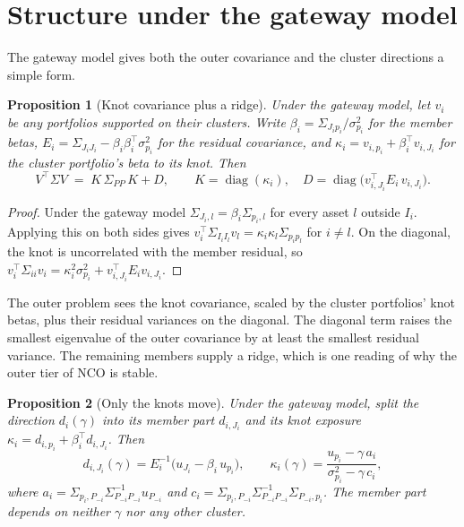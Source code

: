 \documentclass[11pt]{article}
\DeclareMathOperator{\diag}{diag}
\newtheorem{proposition}{Proposition}
\begin{document}
\section{Structure under the gateway model}
\label{sec:structure}

The gateway model gives both the outer covariance and the cluster
directions a simple form.

\begin{proposition}[Knot covariance plus a ridge]
\label{prop:outer}
Under the gateway model, let $v_i$ be any portfolios supported on their
clusters. Write $\beta_i=\Sigma_{J_ip_i}/\sigma_{p_i}^2$ for the member
betas, $E_i=\Sigma_{J_iJ_i}-\beta_i\beta_i^\top\sigma_{p_i}^2$ for the
residual covariance, and $\kappa_i=v_{i,p_i}+\beta_i^\top v_{i,J_i}$ for
the cluster portfolio's beta to its knot. Then
\begin{equation}
  V^\top\Sigma V \;=\; K\,\Sigma_{PP}\,K + D,
  \qquad K=\diag(\kappa_i),
  \quad D=\diag\!\big(v_{i,J_i}^\top E_i\,v_{i,J_i}\big).
  \label{eq:outer}
\end{equation}
\end{proposition}

\begin{proof}
Under the gateway model $\Sigma_{J_i,l}=\beta_i\Sigma_{p_i,l}$ for every
asset $l$ outside $I_i$. Applying this on both sides gives
$v_i^\top\Sigma_{I_iI_l}v_l=\kappa_i\kappa_l\Sigma_{p_ip_l}$ for $i\neq l$.
On the diagonal, the knot is uncorrelated with the member residual, so
$v_i^\top\Sigma_{ii}v_i=\kappa_i^2\sigma_{p_i}^2+v_{i,J_i}^\top E_iv_{i,J_i}$.
\end{proof}

The outer problem sees the knot covariance, scaled by the cluster
portfolios' knot betas, plus their residual variances on the diagonal. The
diagonal term raises the smallest eigenvalue of the outer covariance by at
least the smallest residual variance. The remaining members supply a ridge, which
is one reading of why the outer tier of NCO is stable.

\begin{proposition}[Only the knots move]
\label{prop:knotsmove}
Under the gateway model, split the direction $d_i(\gamma)$ into its member
part $d_{i,J_i}$ and its knot exposure
$\kappa_i=d_{i,p_i}+\beta_i^\top d_{i,J_i}$. Then
\begin{equation}
  d_{i,J_i}(\gamma)=E_i^{-1}\big(u_{J_i}-\beta_i\,u_{p_i}\big),
  \qquad
  \kappa_i(\gamma)=\frac{u_{p_i}-\gamma\,a_i}{\sigma_{p_i}^2-\gamma\,c_i},
  \label{eq:knotsmove}
\end{equation}
where $a_i=\Sigma_{p_i,P_{-i}}\Sigma_{P_{-i}P_{-i}}^{-1}u_{P_{-i}}$ and
$c_i=\Sigma_{p_i,P_{-i}}\Sigma_{P_{-i}P_{-i}}^{-1}\Sigma_{P_{-i},p_i}$. The
member part depends on neither $\gamma$ nor any other cluster.
\end{proposition}
\end{document}
